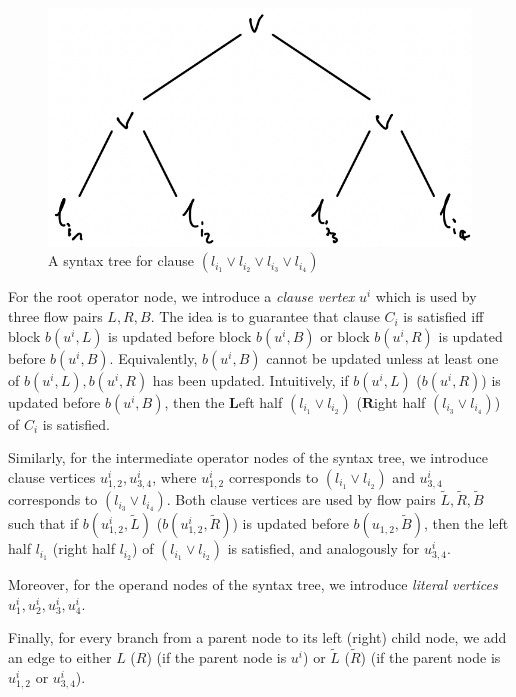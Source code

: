 \documentclass[fontsize=11pt,paper=a4]{book}
\begin{document}
\begin{figure}[htbp]
\centering
\includegraphics[width=.9\linewidth]{../assets/Screen Shot 2023-02-14 at 15.05.37.png}
\caption{\label{fig:org20ebcd1}A syntax tree for clause \((l_{i_1}\vee l_{i_2}\vee l_{i_3}\vee l_{i_4})\)}
\end{figure}

For the root operator node, we introduce a \emph{clause vertex} \(u^i\) which is used by three flow pairs \(L,R,B\).
The idea is to guarantee that clause \(C_i\) is satisfied iff block \(b(u^i,L)\) is updated before block \(b(u^i,B)\) or block \(b(u^i,R)\) is updated before \(b(u^i,B)\).
Equivalently, \(b(u^i,B)\) cannot be updated unless at least one of \(b(u^i,L),b(u^i,R)\) has been updated.
Intuitively, if \(b(u^i,L)\) (\(b(u^i,R)\)) is updated before \(b(u^i,B)\), then the \(\textbf{L}\)eft half \((l_{i_1}\vee l_{i_2})\) (\(\textbf{R}\)ight half \((l_{i_3}\vee l_{i_4})\)) of \(C_i\) is satisfied.

Similarly, for the intermediate operator nodes of the syntax tree, we introduce clause vertices \(u_{1,2}^i,u_{3,4}^i\), where \(u_{1,2}^i\) corresponds to \((l_{i_1}\vee l_{i_2})\) and \(u_{3,4}^i\) corresponds to \((l_{i_3}\vee l_{i_4})\).
Both clause vertices are used by flow pairs \(\tilde{L},\tilde{R},\tilde{B}\) such that if \(b(u_{1,2}^i,\tilde{L})\) (\(b(u_{1,2}^i,\tilde{R})\)) is updated before \(b(u_{1,2},\tilde{B})\), then the left half \(l_{i_1}\) (right half \(l_{i_2}\)) of \((l_{i_1}\vee l_{i_2})\) is satisfied, and analogously for \(u_{3,4}^i\).

Moreover, for the operand nodes of the syntax tree, we introduce \emph{literal vertices} \(u_1^i,u_2^i,u_3^i,u_4^i\).

Finally, for every branch from a parent node to its left (right) child node, we add an edge to either \(L\) (\(R\)) (if the parent node is \(u^i\)) or \(\tilde{L}\) (\(\tilde{R}\)) (if the parent node is \(u_{1,2}^i\) or \(u_{3,4}^i\)).
\end{document}
